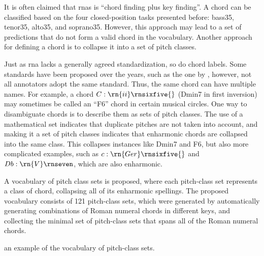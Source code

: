 
It is often claimed that \glspl{rna} is ``chord finding plus
key finding''. A chord can be classified based on the four
\gls{closed-position} tasks presented before: \gls{bass35},
\gls{tenor35}, \gls{alto35}, and \gls{soprano35}. However,
this approach may lead to a set of predictions that do not
form a valid chord in the vocabulary. Another approach for
defining a chord is to collapse it into a set of pitch
classes.

Just as \gls{rna} lacks a generally agreed standardization,
so do chord labels. Some standards have been proposed over
the years, such as the one by \textcite{harte2005automatic},
however, not all annotators adopt the same standard. Thus,
the same chord can have multiple names. For example, a chord
$C:\rn{ii}\rnsixfive{}$ (Dmin7 in first inversion) may
sometimes be called an ``F6'' chord in certain musical
circles. One way to disambiguate chords is to describe them
as sets of pitch classes. The use of a mathematical set
indicates that duplicate pitches are not taken into account,
and making it a set of pitch classes indicates that
enharmonic chords are collapsed into the same class. This
collapses instances like Dmin7 and F6, but also more
complicated examples, such as $c:\rn{Ger}\rnsixfive{}$ and
$Db:\rn{V}\rnseven$, which are also enharmonic.

A vocabulary of pitch class sets is proposed, where each
pitch-class set represents a class of chord, collapsing all
of its enharmonic spellings. The proposed vocabulary
consists of 121 pitch-class sets, which were generated by
automatically generating combinations of Roman numeral
chords in different keys, and collecting the minimal set of
pitch-class sets that spans all of the Roman numeral chords.

 an example of the vocabulary of
pitch-class sets.

